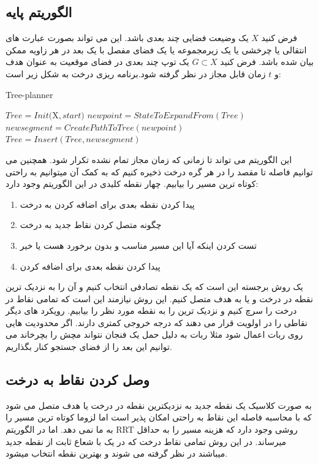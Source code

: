 \subsection{الگوریتم پایه}
فرض کنید
$X$
یک وضیعت فضایی چند بعدی باشد. این می تواند بصورت عبارت های انتقالی یا چرخشی یا یک زیرمجموعه یا یک فضای مفصل با یک بعد در هر زاویه ممکن بیان شده باشد. فرض کنید
$G\subset X$
یک توپ چند بعدی در فضای موقعیت به عنوان هدف و $t$ زمان قابل مجاز  در نظر گرفته شود.برنامه ریزی درخت به شکل زیر است: 
\begin{algorithm}[H]
\caption{Tree-planner}
\begin{latin}
\begin{algorithmic}
\STATE $Tree=Init($X$,start)$
	\STATE $newpoint = StateToExpandFrom(Tree)$
	\STATE $newsegment = CreatePathToTree(newpoint)$
		\STATE $Tree=Insert(Tree,newsegment)$
	\ENDIF
\ENDWHILE
{}

\end{algorithmic}
\end{latin}
\end{algorithm}
این الگوریتم می تواند تا زمانی که زمان مجاز تمام نشده تکرار شود.
همچنین می توانیم فاصله تا مقصد را در هر گره درخت ذخیره کنیم که به کمک آن میتوانیم به راحتی کوتاه ترین مسیر را بیابیم.
چهار نقطه کلیدی در این الگوریتم وجود دارد:
\begin{enumerate}
    \item پیدا کردن نقطه بعدی برای اضافه کردن به درخت
    \item چگونه متصل کردن نقاط جدید به درخت
    \item تست کردن اینکه آیا این مسیر مناسب و بدون برخورد هست یا خیر
    \item پیدا کردن نقطه بعدی برای اضافه کردن
\end{enumerate}
یک روش برجسته این است که یک نقطه تصادفی انتخاب کنیم و آن را به نزدیک ترین نقطه در درخت و یا به هدف متصل کنیم.
این روش نیازمند این است که تمامی نقاط در درخت را سرچ کنیم و نزدیک ترین را به نقطه مورد نظر را بیابیم.
رویکرد های دیگر نقاطی را در اولویت قرار می دهند که درجه خروجی کمتری دارند.
اگر محدودیت هایی روی ربات اعمال شود مثلا ربات به دلیل حمل یک فنجان نتواند مچش را بچرخاند می توانیم این بعد را از فضای جستجو کنار بگذاریم.


\subsection{وصل کردن نقاط به درخت}
به صورت کلاسیک یک نقطه جدید به نزدیکترین نقطه در درخت یا هدف متصل می شود که با محاسبه فاصله این نقاط به راحتی امکان پذیر است اما لزوما کوتاه ترین مسیر را به ما نمی دهد.
اما در الگوریتم RRT روشی وجود دارد که هزینه مسیر را به حداقل میرساند.
در این روش تمامی نقاط درخت که در یک
 با شعاع ثابت از نقطه جدید میباشند در نظر گرفته می شوند و بهترین نقطه انتخاب میشود.



